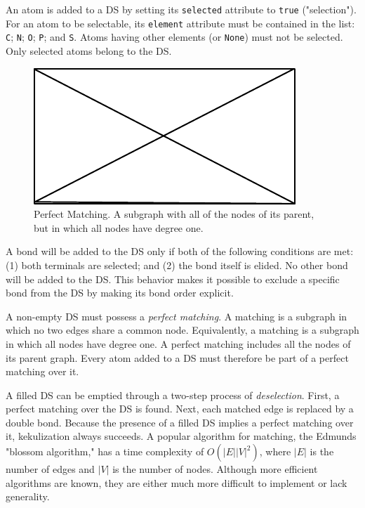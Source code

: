 \documentclass{article}
\def\ttt{\texttt}
\begin{document}
An atom is added to a DS by setting its \ttt{selected} attribute to \ttt{true} ("selection"). For an atom to be selectable, its \ttt{element} attribute must be contained in the list: \ttt{C}; \ttt{N}; \ttt{O}; \ttt{P}; and \ttt{S}. Atoms having other elements (or \ttt{None}) must not be selected. Only selected atoms belong to the DS.

\begin{figure}
    \centering
    \includegraphics{filler}
    \caption{Perfect Matching. A subgraph with all of the nodes of its parent, but in which all nodes have degree one.}
    \label{fig:perfect-matching}
\end{figure}

A bond will be added to the DS only if both of the following conditions are met: (1) both terminals are selected; and (2) the bond itself is elided. No other bond will be added to the DS. This behavior makes it possible to exclude a specific bond from the DS by making its bond order explicit.

A non-empty DS must possess a \textit{perfect matching}. A matching is a subgraph in which no two edges share a common node. Equivalently, a matching is a subgraph in which all nodes have degree one. A perfect matching includes all the nodes of its parent graph. Every atom added to a DS must therefore be part of a perfect matching over it.

A filled DS can be emptied through a two-step process of \textit{deselection}. First, a perfect matching over the DS is found. Next, each matched edge is replaced by a double bond. Because the presence of a filled DS implies a perfect matching over it, kekulization always succeeds. A popular algorithm for matching, the Edmunds "blossom algorithm,"\cite{edmonds:1965} has a time complexity of $O(|E||V|^2)$, where $|E|$ is the number of edges and $|V|$ is the number of nodes. Although more efficient algorithms are known, they are either much more difficult to implement or lack generality.
\end{document}
